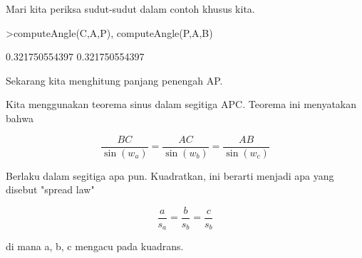\documentclass[12pt,arial,letterpaper]{book}
\begin{document}
\begin{eulercomment}
\begin{eulercomment}
\begin{eulercomment}
\begin{eulercomment}
\begin{eulercomment}
\begin{eulercomment}
\begin{eulercomment}
\begin{eulercomment}
\begin{eulercomment}
\begin{eulercomment}
\begin{eulercomment}
\begin{eulercomment}
\begin{eulercomment}
\begin{eulercomment}
\begin{eulercomment}
\begin{eulercomment}
\begin{eulercomment}
\begin{eulercomment}
\begin{eulercomment}
\begin{eulercomment}
\begin{eulercomment}
\begin{eulercomment}
\begin{eulercomment}
\begin{eulercomment}
\begin{eulercomment}
\begin{eulercomment}
\begin{eulercomment}
\begin{eulercomment}
\begin{eulerprompt}
\end{eulerprompt}
\begin{eulercomment}
Mari kita periksa sudut-sudut dalam contoh khusus kita.
\end{eulercomment}
\begin{eulerprompt}
>computeAngle(C,A,P), computeAngle(P,A,B)
\end{eulerprompt}
\begin{euleroutput}
  0.321750554397
  0.321750554397
\end{euleroutput}
\begin{eulercomment}
Sekarang kita menghitung panjang penengah AP.

Kita menggunakan teorema sinus dalam segitiga APC. Teorema ini
menyatakan bahwa

\end{eulercomment}
\begin{eulerformula}
\[
\frac{BC}{\sin(w_a)} = \frac{AC}{\sin(w_b)} = \frac{AB}{\sin(w_c)}
\]
\end{eulerformula}
\begin{eulercomment}
Berlaku dalam segitiga apa pun. Kuadratkan, ini berarti menjadi apa
yang disebut  "spread law"

\end{eulercomment}
\begin{eulerformula}
\[
\frac{a}{s_a} = \frac{b}{s_b} = \frac{c}{s_b}
\]
\end{eulerformula}
\begin{eulercomment}
di mana a, b, c mengacu pada kuadrans.


\end{eulercomment}
\end{eulercomment}
\end{eulercomment}
\end{eulercomment}
\end{eulercomment}
\end{eulercomment}
\end{eulercomment}
\end{eulercomment}
\end{eulercomment}
\end{eulercomment}
\end{eulercomment}
\end{eulercomment}
\end{eulercomment}
\end{eulercomment}
\end{eulercomment}
\end{eulercomment}
\end{eulercomment}
\end{eulercomment}
\end{eulercomment}
\end{eulercomment}
\end{eulercomment}
\end{eulercomment}
\end{eulercomment}
\end{eulercomment}
\end{eulercomment}
\end{eulercomment}
\end{eulercomment}
\end{eulercomment}
\end{eulercomment}
\end{document}
